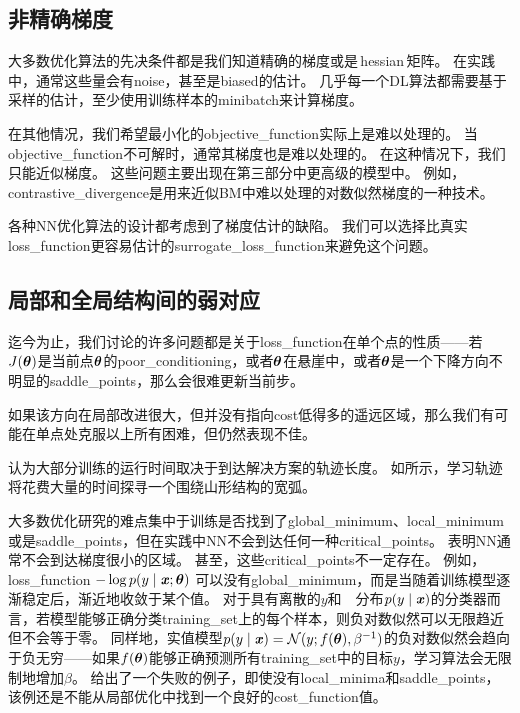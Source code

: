 \subsection{非精确梯度}
\label{sec:inexact_gradients}
大多数优化算法的先决条件都是我们知道精确的梯度或是\,\gls{hessian}\,矩阵。
在实践中，通常这些量会有\gls{noise}，甚至是\gls{biased}的估计。
几乎每一个\gls{DL}算法都需要基于采样的估计，至少使用训练样本的\gls{minibatch}来计算梯度。


在其他情况，我们希望最小化的\gls{objective_function}实际上是难以处理的。
当\gls{objective_function}不可解时，通常其梯度也是难以处理的。
在这种情况下，我们只能近似梯度。
这些问题主要出现在第三部分中更高级的模型中。
例如，\gls{contrastive_divergence}是用来近似\gls{BM}中难以处理的对数似然梯度的一种技术。


各种\gls{NN}优化算法的设计都考虑到了梯度估计的缺陷。
我们可以选择比真实\gls{loss_function}更容易估计的\gls{surrogate_loss_function}来避免这个问题。


\subsection{局部和全局结构间的弱对应}
\label{sec:poor_correspondence_between_local_and_global_structure}
迄今为止，我们讨论的许多问题都是关于\gls{loss_function}在单个点的性质——若$J(\boldsymbol{\theta})$是当前点$\boldsymbol{\theta}$的\gls{poor_conditioning}，或者$\boldsymbol{\theta}$在悬崖中，或者$\boldsymbol{\theta}$是一个下降方向不明显的\gls{saddle_points}，那么会很难更新当前步。


如果该方向在局部改进很大，但并没有指向\gls{cost}低得多的遥远区域，那么我们有可能在单点处克服以上所有困难，但仍然表现不佳。


\cite{GoodfellowOptimization15}认为大部分训练的运行时间取决于到达解决方案的轨迹长度。 
如所示，学习轨迹将花费大量的时间探寻一个围绕山形结构的宽弧。


大多数优化研究的难点集中于训练是否找到了\gls{global_minimum}、\gls{local_minimum}或是\gls{saddle_points}，但在实践中\gls{NN}不会到达任何一种\gls{critical_points}。
表明\gls{NN}通常不会到达梯度很小的区域。
甚至，这些\gls{critical_points}不一定存在。
例如，\gls{loss_function} $-\log p(y\mid\boldsymbol{\mathit{x}};\boldsymbol{\theta})$ 可以没有\gls{global_minimum}，而是当随着训练模型逐渐稳定后，渐近地收敛于某个值。    
对于具有离散的$y$和~~分布$p(y\mid\boldsymbol{\mathit{x}})$的分类器而言，若模型能够正确分类\gls{training_set}上的每个样本，则负对数似然可以无限趋近但不会等于零。
同样地，实值模型$p(y\mid\boldsymbol{\mathit{x}}) = \mathcal{N}(y;f(\boldsymbol{\theta}),\beta^{-1})$的负对数似然会趋向于负无穷——如果$f(\boldsymbol{\theta})$能够正确预测所有\gls{training_set}中的目标$y$，学习算法会无限制地增加$\beta$。
给出了一个失败的例子，即使没有\gls{local_minima}和\gls{saddle_points}，该例还是不能从局部优化中找到一个良好的\gls{cost_function}值。

